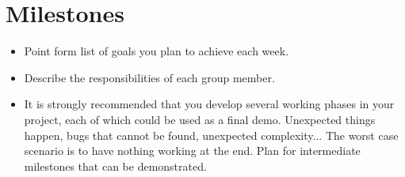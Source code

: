 \documentclass[conference,compsoc]{IEEEtran/IEEEtran}
\begin{document}
\section{Milestones}
\begin{itemize}
\item Point form list of goals you plan to achieve each week.
\item Describe the responsibilities of each group member.
\item It is strongly recommended that you develop several working phases in your project, each of which could be used as a final demo.  Unexpected things happen, bugs that cannot be found, unexpected complexity... The worst case scenario is to have nothing working at the end.  Plan for intermediate milestones that can be demonstrated.
\end{itemize}




\end{document}
